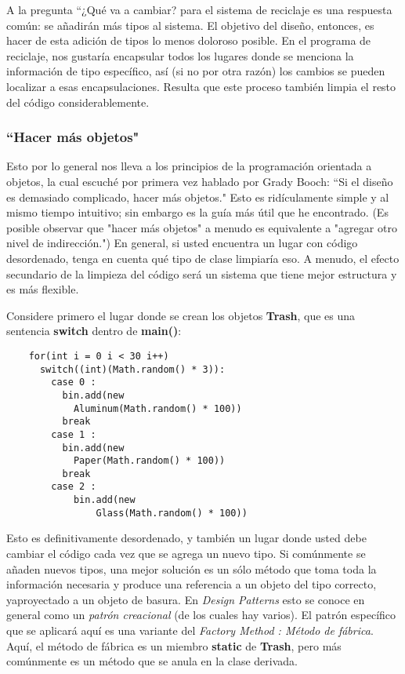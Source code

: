 
A la pregunta “¿Qué va a cambiar? para el sistema de reciclaje es una respuesta común: se añadirán más tipos al sistema. El objetivo del diseño, entonces, es hacer de esta adición de tipos lo menos doloroso posible. En el programa de reciclaje, nos gustaría encapsular todos los lugares donde se menciona la información de tipo específico, así (si no por otra razón) los cambios se pueden localizar a esas encapsulaciones. Resulta que este proceso también limpia el resto del código considerablemente.  \newline

\subsubsection*{“Hacer más objetos"}
\label{subsubsec:med}


Esto por lo general nos lleva a los principios de la programación orientada a objetos, la cual escuché por primera vez hablado por Grady Booch: “Si el diseño es demasiado complicado, hacer más objetos." Esto es ridículamente simple y al mismo tiempo intuitivo; sin embargo es la guía más útil que he encontrado. (Es posible observar que "hacer más objetos" a menudo es equivalente a "agregar otro nivel de indirección.") En general, si usted encuentra un lugar con código desordenado, tenga en cuenta qué tipo de clase limpiaría eso. A menudo, el efecto secundario de la limpieza del código será un sistema que tiene mejor estructura y es más flexible.    \newline

Considere primero el lugar donde se crean los objetos \textbf{Trash}, que es una sentencia \textbf{switch} dentro de \textbf{main()}:    \newline

\begin{lstlisting} 
    for(int i = 0 i < 30 i++) 
      switch((int)(Math.random() * 3)): 
        case 0 : 
          bin.add(new 
            Aluminum(Math.random() * 100)) 
          break 
        case 1 : 
          bin.add(new 
            Paper(Math.random() * 100)) 
          break 
        case 2 : 
            bin.add(new 
                Glass(Math.random() * 100)) 
\end{lstlisting}

Esto es definitivamente desordenado, y también un lugar donde usted debe cambiar el código cada vez que se agrega un nuevo tipo. Si comúnmente se añaden nuevos tipos, una mejor solución es un sólo método que toma toda la información necesaria y produce una referencia a un objeto del tipo correcto, yaproyectado a un objeto de basura. En \textit{Design Patterns} esto se conoce en general como un \textit{patrón creacional} (de los cuales hay varios). El patrón específico que se aplicará aquí es una variante del \textit{Factory Method : Método de fábrica}. Aquí, el método de fábrica es un miembro \textbf{static} de \textbf{Trash}, pero más comúnmente es un método que se anula en la clase derivada.  \newline

